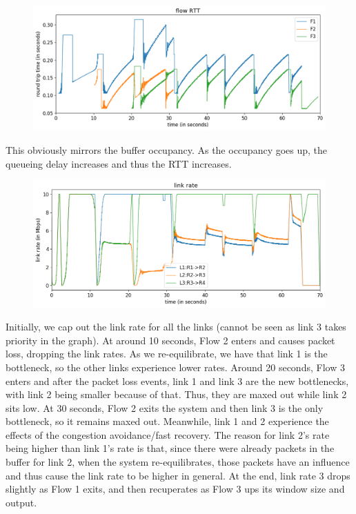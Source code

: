 \documentclass{article}
\begin{document}
\begin{figure}[H]
\centering
\includegraphics[width = \textwidth]{test_case2_reno flow RTT.png}
\end{figure}

This obviously mirrors the buffer occupancy. As the occupancy goes up, the queueing delay increases and thus the RTT increases.

\begin{figure}[H]
\centering
\includegraphics[width = \textwidth]{test_case2_reno link rate.png}
\end{figure}

Initially, we cap out the link rate for all the links (cannot be seen as link 3 takes priority in the graph). At around 10 seconds, Flow 2 enters and causes packet loss, dropping the link rates. As we re-equilibrate, we have that link 1 is the bottleneck, so the other links experience lower rates. Around 20 seconds, Flow 3 enters and after the packet loss events, link 1 and link 3 are the new bottlenecks, with link 2 being smaller because of that. Thus, they are maxed out while link 2 sits low. At 30 seconds, Flow 2 exits the system and then link 3 is the only bottleneck, so it remains maxed out. Meanwhile, link 1 and 2 experience the effects of the congestion avoidance/fast recovery. The reason for link 2's rate being higher than link 1's rate is that, since there were already packets in the buffer for link 2, when the system re-equilibrates, those packets have an influence and thus cause the link rate to be higher in general. At the end, link rate 3 drops slightly as Flow 1 exits, and then recuperates as Flow 3 ups its window size and output.
\end{document}
